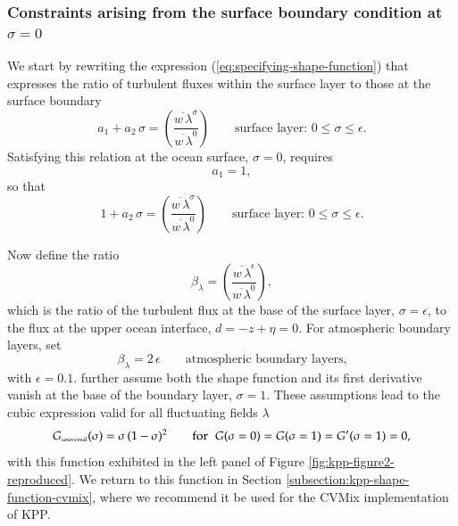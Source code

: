 \subsubsection{Constraints arising from the surface boundary condition
at $\sigma=0$}

We start by rewriting the expression
(\ref{eq:specifying-shape-function}) that expresses the ratio of
turbulent fluxes within the surface layer to those at the surface
boundary 
\begin{equation}
  a_{1} + a_{2} \, \sigma = \left( \frac{ \overline{w \, \lambda}^{\sigma}}{\overline{w \, \lambda}^{0}} \right)
 \qquad  \mbox{surface layer: $0 \le \sigma \le \epsilon$.}
\label{eq:specifying-shape-function-again}
\end{equation}
Satisfying this relation at the ocean surface, $\sigma=0$, requires
\begin{equation}
 a_{1} = 1, 
\end{equation}
 so that 
\begin{equation}
  1 + a_{2} \, \sigma = \left( \frac{ \overline{w \, \lambda}^{\sigma}}{\overline{w \, \lambda}^{0}} \right)
 \qquad  \mbox{surface layer: $0 \le \sigma \le \epsilon$.}
\label{eq:specifying-shape-function-againB}
\end{equation}

Now define the ratio
\begin{equation}
  \beta_{\lambda} = \left( \frac{ \overline{w \, \lambda}^{\epsilon}}{\overline{w \, \lambda}^{0}} \right),
\label{eq:beta-lambda-defined}
\end{equation}
which is the ratio of the turbulent flux at the base of the surface
layer, $\sigma = \epsilon$, to the flux at the upper ocean interface,
$d = -z + \eta = 0$.  For atmospheric boundary layers,
\cite{Troen_Mahrt1986} set
\begin{equation}
 \beta_{\lambda}  = 2 \, \epsilon \qquad \mbox{atmospheric boundary layers,} 
\end{equation}
with $\epsilon=0.1$.  \cite{Troen_Mahrt1986} further assume both the
shape function and its first derivative vanish at the base of the
boundary layer, $\sigma=1$.  These assumptions lead to the cubic
expression valid for all fluctuating fields $\lambda$
\begin{equation}
 G_{\mbox{\tiny universal}}(\sigma) = \sigma \, (1-\sigma)^{2}   \qquad \mbox{for} \; \; G(\sigma=0) = G(\sigma=1) = G'(\sigma=1) = 0, 
\label{eq:simple-shape-function}
\end{equation}
with this function exhibited in the left panel of Figure
\ref{fig:kpp-figure2-reproduced}.  We return to this function in
Section \ref{subsection:kpp-shape-function-cvmix}, where we recommend
it be used for the CVMix implementation of KPP.  


